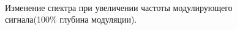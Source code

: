 \documentclass[a4paper, 12pt,twoside]{article}
\begin{document}
\begin{figure}[H]
\begin{minipage}[h]{0.49\linewidth}
		 \\ 
	\end{minipage}
	\begin{minipage}[h]{0.49\linewidth}
		 \\[0,9cm]
		 \\ 
	\end{minipage}
	
	\caption{Изменение спектра при увеличении частоты модулирующего сигнала(100$\%$ глубина модуляции).}
	\label{ris:image12}
\end{figure}
\end{document}
